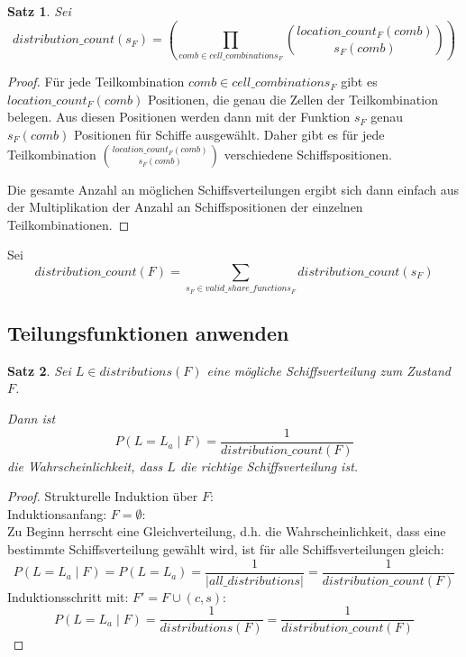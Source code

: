\documentclass[a4paper,12pt]{llncs}
\numberwithin{equation}{section}
\newtheorem{satz}{Satz}
\begin{document}
\begin{satz}
Sei
\[
distribution\_count(s_F)=
\left( \prod_{comb \in cell\_combinations_F}{{location\_count_F(comb)\choose s_F(comb)}} \right)
\]
\end{satz}

\begin{proof}
Für jede Teilkombination $comb \in cell\_combinations_F$ gibt es $location\_count_F(comb)$ Positionen, die genau die Zellen der Teilkombination belegen. Aus diesen Positionen werden dann mit der Funktion $s_F$ genau $s_F(comb)$ Positionen für Schiffe ausgewählt. Daher gibt es für jede Teilkombination ${location\_count_F(comb)\choose s_F(comb)}$ verschiedene Schiffspositionen.

Die gesamte Anzahl an möglichen Schiffsverteilungen ergibt sich dann einfach aus der Multiplikation der Anzahl an Schiffspositionen der einzelnen Teilkombinationen.
\end{proof}

\begin{definition}
Sei
\[
distribution\_count(F)=\sum_{s_F \in valid\_share\_functions_F}{distribution\_count(s_F)}
\]
\end{definition}

\subsection{Teilungsfunktionen anwenden}

\begin{satz}
Sei $L \in distributions(F)$ eine mögliche Schiffsverteilung zum Zustand $F$.

Dann ist
\[
P(L = L_a \mid F)=\frac{1}{distribution\_count(F)}
\]
die Wahrscheinlichkeit, dass $L$ die richtige Schiffsverteilung ist.
\end{satz}

\begin{proof}
Strukturelle Induktion über $F$:\\
Induktionsanfang: $F=\emptyset$:\\
Zu Beginn herrscht eine Gleichverteilung, d.h. die Wahrscheinlichkeit, dass eine bestimmte Schiffsverteilung gewählt wird, ist für alle Schiffsverteilungen gleich:
\[
P(L = L_a \mid F)=P(L = L_a)=\frac{1}{|all\_distributions|}=\frac{1}{distribution\_count(F)}
\]
Induktionsschritt mit: $F'=F \cup (c,s)$:\\
\[
P(L = L_a \mid F)=\frac{1}{distributions(F)}=\frac{1}{distribution\_count(F)}
\]
\end{proof}
\end{document}
